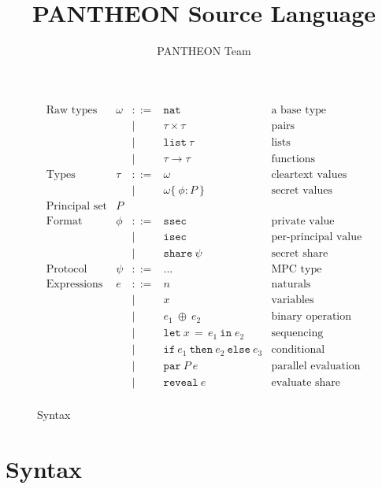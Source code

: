 \documentclass[10pt]{article}
\title{PANTHEON Source Language}
\author{PANTHEON Team}
\newcommand{\kw}[1]{\ensuremath{\mathtt{#1}}}
\newcommand{\tnat}{\ensuremath{\mathtt{nat}}}
\newcommand{\tlist}[1]{\ensuremath{\mathtt{list}~{#1}}}
\newcommand{\tfun}[2]{\ensuremath{{#1} \rightarrow {#2}}}
\newcommand{\tprod}[2]{\ensuremath{{#1} \times {#2}}}
\newcommand{\ssec}{\ensuremath{\mathtt{ssec}}}
\newcommand{\isec}{\ensuremath{\mathtt{isec}}}
\newcommand{\sshare}[1]{\ensuremath{\mathtt{share}~{#1}}}
\newcommand{\sectyp}[3]{\ensuremath{{#1} \{~{#2}:{#3}~\}}}
\newcommand{\ebinop}[2]{\ensuremath{{#1}~\oplus~{#2}}}
\newcommand{\elet}[3]{\ensuremath{\kw{let}~#1\, =\, #2~\kw{in}\;{#3}}}
\newcommand{\epar}[2]{\ensuremath{\kw{par}~{#1}~{#2}}}
\newcommand{\ereveal}[1]{\ensuremath{\kw{reveal}~{#1}}}
\newcommand{\econd}[3]{\ensuremath{\kw{if}~{#1}~\kw{then}~{#2}~\kw{else}~{#3}}}
\begin{document}
\maketitle

\begin{figure}[h]
  \centering
  \[\begin{array}{rlcll}
      \text{Raw types} & \omega  & ::=  & \tnat & \text{a base type} \\      
                       && \mid & \tprod{\tau}{\tau} & \text{pairs} \\
                       && \mid & \tlist{\tau} & \text{lists} \\
                       && \mid & \tfun{\tau}{\tau} & \text{functions} \\
      \text{Types} & \tau & ::= & \omega & \text{cleartext values} \\
                       && \mid & \sectyp\omega\phi{P} & \text{secret values} \\
      \text{Principal set} & P \\
      \text{Format} & \phi & ::= & \ssec & \text{private value}  \\
                       && \mid & \isec & \text{per-principal value}  \\
                       && \mid & \sshare{\psi} & \text{secret share} \\
      \text{Protocol} & \psi & ::= & ... & \text{MPC type} \\
      \text{Expressions} & e & ::= & n & \text{naturals} \\
                       && \mid & x & \text{variables} \\
                       && \mid & \ebinop{e_1}{e_2}  & \text{binary operation} \\
                       && \mid & \elet{x}{e_1}{e_2}  & \text{sequencing} \\
                       && \mid & \econd{e_1}{e_2}{e_3}  & \text{conditional} \\
                       && \mid & \epar{P}{e} & \text{parallel evaluation}\\
                       && \mid & \ereveal{e} & \text{evaluate share}\\
  \end{array}
  \]
  \caption{Syntax}
  \label{fig:syntax}
\end{figure}

\section{Syntax}
\end{document}
